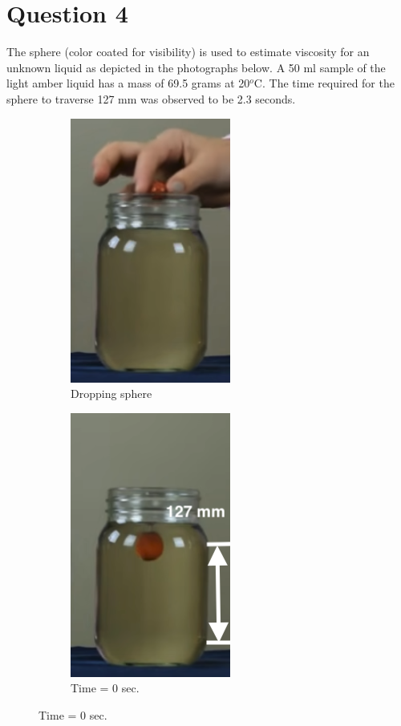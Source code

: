 \documentclass[12pt]{article}
\begin{document}
\section*{Question 4}
The sphere (color coated for visibility) is used to estimate viscosity for an unknown liquid as depicted in the photographs below. A 50 ml sample of the light amber liquid has a mass of 69.5 grams at 20$^o$C. The time required for the sphere to traverse 127 mm was observed to be 2.3 seconds.
\begin{figure}[h!]
\centering
\begin{subfigure}{.3\textwidth}
  \centering
  \includegraphics[width=.4\linewidth]{drop.png}
  \caption{Dropping sphere}
  \label{fig:sub1}
\end{subfigure}%
\begin{subfigure}{.3\textwidth}
  \centering
  \includegraphics[width=.4\linewidth]{begin.png}
  \caption{Time = 0 sec.}

\end{subfigure}
\end{figure}
\end{document}
